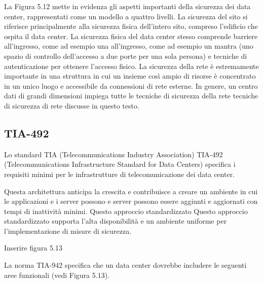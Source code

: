 La Figura 5.12 mette in evidenza gli aspetti importanti della sicurezza dei data center, rappresentati come un modello a quattro livelli. La sicurezza del sito si riferisce principalmente alla sicurezza fisica dell'intero sito, compreso l'edificio che ospita il data center. La sicurezza fisica del data center stesso comprende barriere all'ingresso, come ad esempio una all'ingresso, come ad esempio un mantra (uno spazio di controllo dell'accesso a due porte per una sola persona) e tecniche di autenticazione per ottenere l'accesso fisico. La sicurezza della rete è estremamente importante in una struttura in cui un insieme così ampio di risorse è concentrato in un unico luogo e accessibile da connessioni di rete esterne. In genere, un centro dati di grandi dimensioni impiega tutte le tecniche di sicurezza della rete tecniche di sicurezza di rete discusse in questo testo.
\subsection{TIA-492}
Lo standard TIA (Telecommunications Industry Association) TIA-492 (Telecommunications Infrastructure Standard for Data Centers) specifica i requisiti minimi per le infrastrutture di telecomunicazione dei data center. 

\singlespacing

Questa architettura anticipa la crescita e contribuisce a creare un ambiente in cui le applicazioni e i server possono
e server possono essere aggiunti e aggiornati con tempi di inattività minimi. Questo approccio standardizzato
Questo approccio standardizzato supporta l'alta disponibilità e un ambiente uniforme per l'implementazione di misure di sicurezza. 

Inserire figura 5.13

\singlespacing

La norma TIA-942 specifica che un data center dovrebbe includere le seguenti aree funzionali (vedi Figura 5.13).

